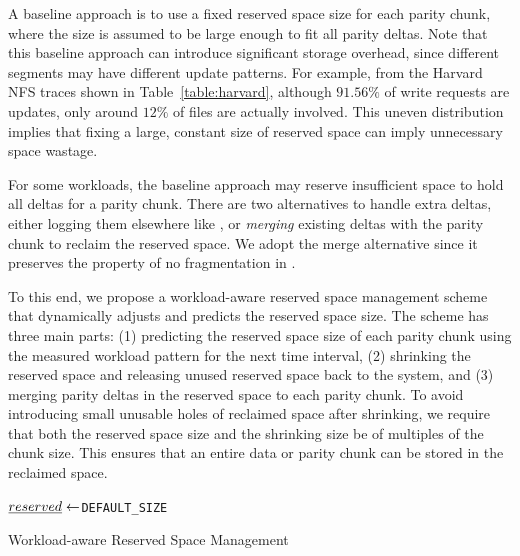 

A baseline approach is to use a fixed reserved space size for each parity
chunk, where the size is assumed to be large enough to fit all parity deltas.  
Note that this baseline approach can introduce
significant storage overhead, since different segments may have different
update patterns.  For example, from the Harvard NFS traces shown in
Table~\ref{table:harvard}, although $91.56\%$ of write requests are updates,
only around $12\%$ of files are actually involved.  This uneven distribution
implies that fixing a large, constant size of reserved space can imply
unnecessary space wastage. 

For some workloads, the baseline approach may reserve insufficient space to
hold all deltas for a parity chunk. There are two alternatives to handle extra
deltas, either logging them elsewhere like \PL, or \textit{merging} existing
deltas with the parity chunk to reclaim the reserved space.  We adopt the
merge alternative since it preserves the property of no fragmentation in
\PLR.

To this end, we propose a workload-aware reserved space management scheme that
dynamically adjusts and predicts the reserved space size. The scheme has
three main parts: 
(1) predicting the reserved space size of each parity chunk 
using the measured workload pattern for the next time interval, 
(2) shrinking the reserved space and releasing unused reserved space back to 
the system, and
(3) merging parity deltas in the reserved space to each parity chunk.
To avoid introducing small unusable holes of reclaimed space after shrinking,
we require that both the reserved space size and the shrinking size be of
multiples of the chunk size.  This ensures that an entire data or parity chunk
can be stored in the reclaimed space. 

\begin{algorithm}[t]
\DontPrintSemicolon
$\emph{reserved} \gets $\verb|DEFAULT_SIZE|\;
\While{$\rm{true}$}{
  \KwSty{sleep}$(\emph{period})$\;
  \ForEach{chunk \textbf{\emph{in}} parityChunkSet}{
  $\emph{utility} \gets $ \FuncSty{getUtility}$(\emph{chunk})$ \;
  $\emph{size} \gets $ \FuncSty{computeShrinkSize}$(\emph{utility})$ \;
    \FuncSty{doShrink}$(\emph{size}, \emph{chunk})$  \label{line:deallocate} \;
    \FuncSty{doMerge}$(\emph{chunk})$ \;
  }
}
\caption{Workload-aware Reserved Space Management}
\label{alg:deallocate}
\end{algorithm}

